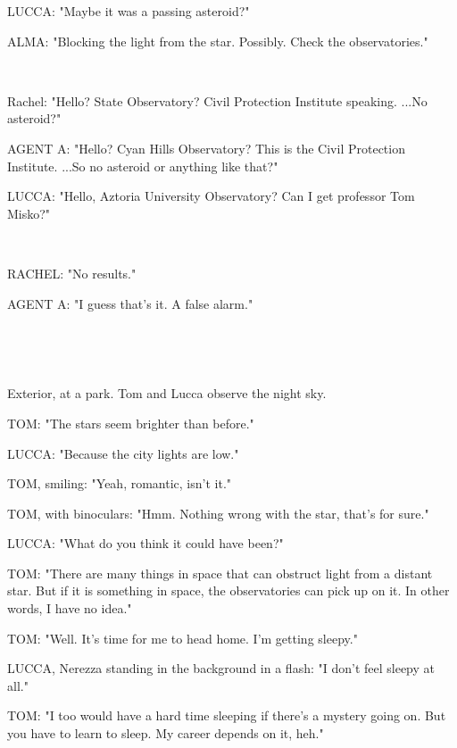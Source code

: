 \documentclass[11pt]{article}
\begin{document}
LUCCA: "Maybe it was a passing asteroid?"

ALMA: "Blocking the light from the star. Possibly. 
Check the observatories."

\ 

Rachel: "Hello? State Observatory? Civil Protection Institute speaking.
...No asteroid?"

AGENT A: "Hello? Cyan Hills Observatory? This is the Civil Protection Institute. 
...So no asteroid or anything like that?"

LUCCA: "Hello, Aztoria University Observatory? Can I get professor Tom Misko?"

\ 

RACHEL: "No results."

AGENT A: "I guess that's it. 
A false alarm."

\ 

\ 

Exterior, at a park. 
Tom and Lucca observe the night sky.

TOM: "The stars seem brighter than before."

LUCCA: "Because the city lights are low."

TOM, smiling: "Yeah, romantic, isn't it."

TOM, with binoculars: "Hmm. Nothing wrong with the star, that's for sure."

LUCCA: "What do you think it could have been?"

TOM: "There are many things in space that can obstruct light from a distant star. 
But if it is something in space, the observatories can pick up on it.
In other words, I have no idea."

TOM: "Well. It's time for me to head home.
I'm getting sleepy."

LUCCA, Nerezza standing in the background in a flash: "I don't feel sleepy at all."

TOM: "I too would have a hard time sleeping if there's a mystery going on.
But you have to learn to sleep.
My career depends on it, heh."

\ 

\ 
\end{document}
